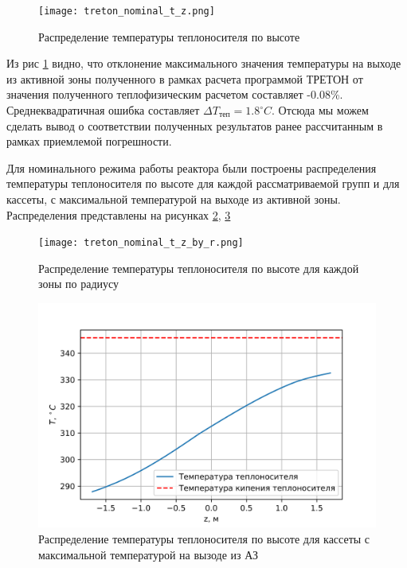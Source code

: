 \begin{figure}[H]
	\begin{center}
		\texttt{[image: treton\_nominal\_t\_z.png]}
		\caption{Распределение температуры теплоносителя по высоте}
		\label{pic:treton-t-tepl-compare-teplofiz} %
	\end{center}
\end{figure}

Из рис \ref{pic:treton-t-tepl-compare-teplofiz} видно, что отклонение максимального значения температуры на выходе из активной зоны полученного в рамках расчета программой ТРЕТОН от значения полученного теплофизическим расчетом составляет -0.08\%. Среднеквадратичная ошибка составляет $\Delta {T_{\text{теп}}} = 1.8 ^\circ C$. Отсюда мы можем сделать вывод о соответствии полученных результатов ранее рассчитанным в рамках приемлемой погрешности.

Для номинального режима работы реактора были построены распределения температуры теплоносителя по высоте для каждой рассматриваемой групп и для кассеты, с максимальной температурой на выходе из активной зоны. Распределения представлены на рисунках \ref{pic:treton-t-tepl-nominal-by-r}, \ref{pic:treton-t-tepl-nominal-max}

\begin{figure}[H]
	\begin{center}
		\texttt{[image: treton\_nominal\_t\_z\_by\_r.png]}
		\caption{Распределение температуры теплоносителя по высоте для каждой зоны по радиусу}
		\label{pic:treton-t-tepl-nominal-by-r} %
	\end{center}
\end{figure}

\begin{figure}[H]
	\begin{center}
		\includegraphics{treton_nominal_t_z_max.png}
		\caption{Распределение температуры теплоносителя по высоте для кассеты с максимальной температурой на вызоде из АЗ}
		\label{pic:treton-t-tepl-nominal-max} %
	\end{center}
\end{figure}

